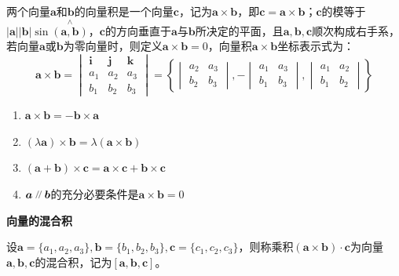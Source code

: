 两个向量$\bm{a}$和$\bm{b}$的向量积是一个向量$\bm{c}$，记为$\bm{a}\times\bm{b}$，即$\bm{c}=\bm{a}\times\bm{b}$；$\bm{c}$的模等于$|\bm{a}||\bm{b}|\sin\overset{\wedge}{(\bm{a},\bm{b})}$，$\bm{c}$的方向垂直于$\bm{a}$与$\bm{b}$所决定的平面，且$\bm{a},\bm{b},\bm{c}$顺次构成右手系，若向量$\bm{a}$或$\bm{b}$为零向量时，则定义$\bm{a}\times\bm{b}=0$，向量积$\bm{a}\times\bm{b}$坐标表示式为：
\begin{equation} 
    \bm{a}\times\bm{b}=
    \begin{vmatrix}
        \bm{i} & \bm{j} & \bm{k} \\
        a_1 & a_2 & a_3 \\
        b_1 & b_2 & b_3
    \end{vmatrix}
    = \left\{
        \begin{vmatrix}
            a_2 & a_3 \\
            b_2 & b_3
        \end{vmatrix},
        -\begin{vmatrix}
            a_1 & a_3 \\
            b_1 & b_3
        \end{vmatrix},
        \begin{vmatrix}
            a_1 & a_2 \\
            b_1 & b_2
        \end{vmatrix}
    \right\}
    \nonumber
\end{equation}

\begin{property} \label{property:cross_product}
    \begin{enumerate}
        \item $\bm{a}\times\bm{b} = -\bm{b}\times\bm{a}$
        \item $(\lambda \bm{a})\times\bm{b} = \lambda(\bm{a}\times\bm{b})$
        \item $(\bm{a}+\bm{b})\times\bm{c}=\bm{a}\times\bm{c}+\bm{b}\times\bm{c}$
        \item $\bm{a}\pll\bm{b}$的充分必要条件是$\bm{a}\times\bm{b}=0$
    \end{enumerate}
\end{property}
\vspace{2mm}

\textbf{向量的混合积}

设$\bm{a}=\{a_1,a_2,a_3\},\bm{b}=\{b_1,b_2,b_3\},\bm{c}=\{c_1,c_2,c_3\}$，则称乘积$(\bm{a}\times\bm{b})\cdot\bm{c}$为向量$\bm{a},\bm{b},\bm{c}$的混合积，记为$[\bm{a},\bm{b},\bm{c}]$。

